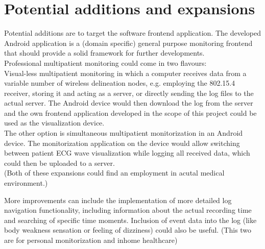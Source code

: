 	
	\section{Potential additions and expansions}

		Potential additions are to target the software frontend application. The developed Android application is a (domain specific) general purpose monitoring frontend that should provide a solid framework for further developments.\\

		Professional multipatient monitoring could come in two flavours:\\

		Visual-less multipatient monitoring in which a computer receives data from a variable number of wireless delineation nodes, e.g. employing the 802.15.4 receiver, storing it and acting as a server, or directly sending the log files to the actual server. The Android device would then download the log from the server and the own frontend application developed in the scope of this project could be used as the visualization device.\\

		The other option is simultaneous multipatient monitorization in an Android device. The monitorization application on the device would allow switching between patient ECG wave visualization while logging all received data, which could then be uploaded to a server.\\

		(Both of these expansions could find an employment in acutal medical environment.)


		More improvements can include the implementation of more detailed log navigation functionality, including information about the actual recording time and searching of specific time moments.
		Inclusion of event data into the log (like body weakness sensation or feeling of dizziness) could also be useful.
		(This two are for personal monitorization and inhome healthcare)\\

